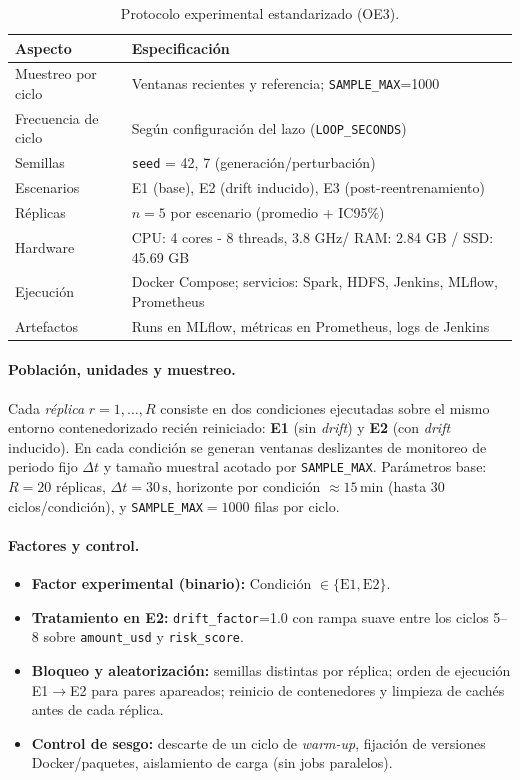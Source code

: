 \begin{table}[htbp]
\centering
\caption{Protocolo experimental estandarizado (OE3).}
\label{tab:oe3-protocolo}
\begin{tabular}{ll}
\toprule
\textbf{Aspecto} & \textbf{Especificación} \\
\midrule
Muestreo por ciclo & Ventanas recientes y referencia; \texttt{SAMPLE\_MAX}=1000 \\
Frecuencia de ciclo & Según configuración del lazo (\texttt{LOOP\_SECONDS}) \\
Semillas & \texttt{seed} = 42, 7 (generación/perturbación) \\
Escenarios & E1 (base), E2 (drift inducido), E3 (post-reentrenamiento) \\
Réplicas & $n=5$ por escenario (promedio + IC95\%) \\
Hardware & CPU: 4 cores - 8 threads, 3.8 GHz/ RAM: 2.84 GB / SSD: 45.69 GB \\
Ejecución & Docker Compose; servicios: Spark, HDFS, Jenkins, MLflow, Prometheus \\
Artefactos & Runs en MLflow, métricas en Prometheus, logs de Jenkins \\
\bottomrule
\end{tabular}
\end{table}
\paragraph{Población, unidades y muestreo.}
Cada \emph{réplica} $r=1,\dots,R$ consiste en dos condiciones ejecutadas sobre el mismo entorno contenedorizado recién reiniciado:
\textbf{E1} (sin \textit{drift}) y \textbf{E2} (con \textit{drift} inducido).
En cada condición se generan ventanas deslizantes de monitoreo de periodo fijo $\Delta t$ y tamaño muestral acotado por \texttt{SAMPLE\_MAX}.
Parámetros base: $R=20$ réplicas, $\Delta t=30\,\mathrm{s}$, horizonte por condición $\approx 15\,\mathrm{min}$ (hasta 30 ciclos/condición), y \texttt{SAMPLE\_MAX}$=1000$ filas por ciclo.

\paragraph{Factores y control.}
\begin{itemize}\setlength\itemsep{2pt}
  \item \textbf{Factor experimental (binario):} Condición $\in\{\mathrm{E1},\mathrm{E2}\}$.
  \item \textbf{Tratamiento en E2:} \texttt{drift\_factor}=1.0 con rampa suave entre los ciclos 5–8 sobre \texttt{amount\_usd} y \texttt{risk\_score}.
  \item \textbf{Bloqueo y aleatorización:} semillas distintas por réplica; orden de ejecución E1$\rightarrow$E2 para pares apareados; reinicio de contenedores y limpieza de cachés antes de cada réplica.
  \item \textbf{Control de sesgo:} descarte de un ciclo de \emph{warm-up}, fijación de versiones Docker/paquetes, aislamiento de carga (sin jobs paralelos).
\end{itemize}

